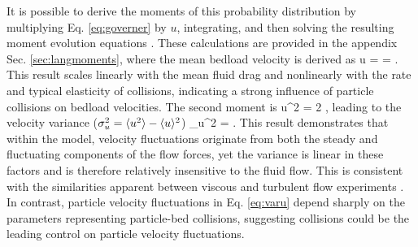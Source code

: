 It is possible to derive the moments of this probability distribution by multiplying Eq. \ref{eq:governer} by $u$, integrating, and then solving the resulting moment evolution equations \citep[e.g.][]{Cox1965}.
These calculations are provided in the appendix Sec. \ref{sec:langmoments}, where the mean bedload velocity is derived as
\be \langle u \rangle =  = . \label{eq:meanu}\ee
This result scales linearly with the mean fluid drag and nonlinearly with the rate and typical elasticity of collisions, indicating a strong influence of particle collisions on bedload velocities.
The second moment is
\be \langle u^2 \rangle = 2 , \ee
leading to the velocity variance ($\sigma_u^2 = \langle u^2 \rangle - \langle u \rangle ^2 $)
\be \sigma_u^2 = . \label{eq:varu}\ee
This result demonstrates that within the model, velocity fluctuations originate from both the steady and fluctuating components of the flow forces, yet the variance is linear in these factors and is therefore relatively insensitive to the fluid flow.
This is consistent with the similarities apparent between viscous and turbulent flow experiments \citep[e.g.][]{Charru2004,Lajeunesse2010}.
In contrast, particle velocity fluctuations in Eq. \ref{eq:varu} depend sharply on the parameters representing particle-bed collisions, suggesting collisions could be the leading control on particle velocity fluctuations.

